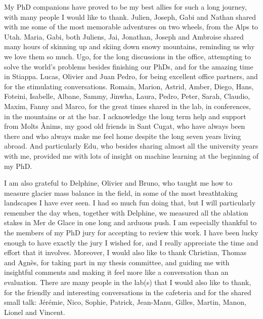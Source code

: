 My PhD companions have proved to be my best allies for such a long journey, with many people I would like to thank. Julien, Joseph, Gabi and Nathan shared with me some of the most memorable adventures on two wheels, from the Alps to Utah. Maria, Gabi, both Juliens, Jai, Jonathan, Joseph and Ambroise shared many hours of skinning up and skiing down snowy mountains, reminding us why we love them so much. Ugo, for the long discussions in the office, attempting to solve the world's problems besides finishing our PhDs, and for the amazing time in Stiappa. Lucas, Olivier and Juan Pedro, for being excellent office partners, and for the stimulating conversations. Romain, Marion, Astrid, Amber, Diego, Hans, Foteini, Isabelle, Albane, Sammy, Jinwha, Laura, Pedro, Peter, Sarah, Claudio, Maxim, Fanny and Marco, for the great times shared in the lab, in conferences, in the mountains or at the bar. I acknowledge the long term help and support from Molts Ànims, my good old friends in Sant Cugat, who have always been there and who always make me feel home despite the long seven years living abroad. And particularly Edu, who besides sharing almost all the university years with me, provided me with lots of insight on machine learning at the beginning of my PhD.

I am also grateful to Delphine, Olivier and Bruno, who taught me how to measure glacier mass balance in the field, in some of the most breathtaking landscapes I have ever seen. I had so much fun doing that, but I will particularly remember the day when, together with Delphine, we measured all the ablation stakes in Mer de Glace in one long and arduous push. I am especially thankful to the members of my PhD jury for accepting to review this work. I have been lucky enough to have exactly the jury I wished for, and I really appreciate the time and effort that it involves. Moreover, I would also like to thank Christian, Thomas and Agnès, for taking part in my thesis committee, and guiding me with insightful comments  and making it feel more like a conversation than an evaluation. There are many people in the lab(s) that I would also like to thank, for the friendly and interesting conversations in the cafeteria and for the shared small talk: Jérémie, Nico, Sophie, Patrick, Jean-Manu, Gilles, Martin, Manon, Lionel and Vincent. 

